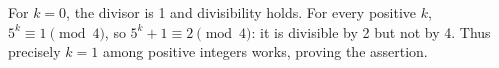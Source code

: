 For $k=0$, the divisor is 1 and divisibility holds. For every positive $k$, $5^k\equiv1\pmod4$, so $5^k+1\equiv2\pmod4$: it is divisible by 2 but not by 4. Thus precisely $k=1$ among positive integers works, proving the assertion.
